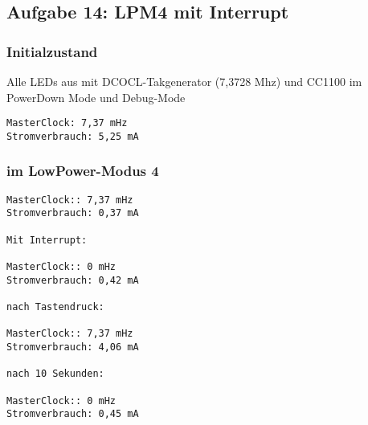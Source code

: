 \subsection*{Aufgabe 14: LPM4 mit Interrupt}

\subsubsection{Initialzustand}
Alle LEDs aus mit DCOCL-Takgenerator (7,3728 Mhz) und CC1100 im PowerDown Mode und Debug-Mode

\begin{verbatim}MasterClock: 7,37 mHz
Stromverbrauch: 5,25 mA\end{verbatim}

\subsubsection{im LowPower-Modus 4}
\begin{verbatim}MasterClock:: 7,37 mHz
Stromverbrauch: 0,37 mA

Mit Interrupt:

MasterClock:: 0 mHz
Stromverbrauch: 0,42 mA

nach Tastendruck:

MasterClock:: 7,37 mHz
Stromverbrauch: 4,06 mA

nach 10 Sekunden:

MasterClock:: 0 mHz
Stromverbrauch: 0,45 mA\end{verbatim}

